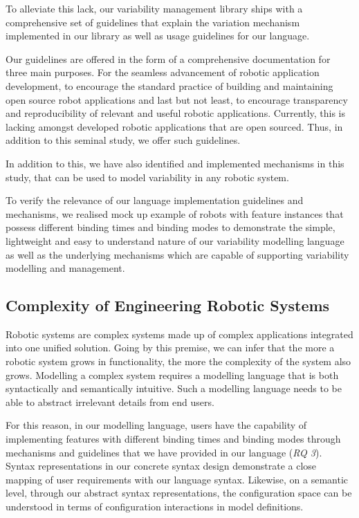 \documentclass[conference]{IEEEtran}
\begin{document}
To alleviate this lack, our variability management library ships with a comprehensive set of guidelines that explain the variation mechanism implemented in our library as well as usage guidelines for our language.

Our guidelines are offered in the form of a comprehensive documentation for three main purposes. For the seamless advancement of robotic application development, to encourage the standard practice of building and maintaining open source robot applications and last but not least, to encourage transparency and reproducibility of relevant and useful robotic applications. Currently, this is lacking amongst developed robotic applications that are open sourced. Thus, in addition to this seminal study, we offer such guidelines.

In addition to this, we have also identified and implemented mechanisms in this study, that can be used to model variability in any robotic system.

To verify the relevance of our language implementation guidelines and mechanisms, we realised mock up example of robots with feature instances that possess different binding times and binding modes to demonstrate the simple, lightweight and easy to understand nature of our variability modelling language as well as the underlying mechanisms which are capable of supporting variability modelling and management.

\subsection{Complexity of Engineering Robotic Systems}
Robotic systems are complex systems made up of complex applications integrated into one unified solution. Going by this premise, we can infer that the more a robotic system grows in functionality, the more the complexity of the system also grows. Modelling a complex system requires a modelling language that is both syntactically and semantically intuitive. Such a modelling language needs to be able to abstract irrelevant details from end users.

For this reason, in our modelling language, users have the capability of implementing features with different binding times and binding modes through mechanisms and guidelines that we have provided in our language (\textit{RQ 3}). Syntax representations in our concrete syntax design demonstrate a close mapping of user requirements with our language syntax. Likewise, on a semantic level, through our abstract syntax representations, the configuration space can be understood in terms of configuration interactions in model definitions.
\end{document}
